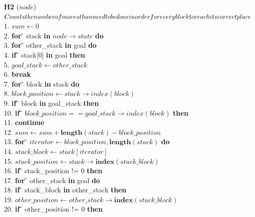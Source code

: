 \documentclass{article}
\begin{document}
\begin{center}
\begin{tabbing}
\textbf{H2} ($node$) \\
\rhd$ Counts the number of moves than need to be done in order \\ for every block to reach its correct place $\\
1. \indent $sum \leftarrow 0$ \\
2. \indent\textbf{for \=} stack \textbf{in} $node\rightarrow state$ \textbf{do}\\
3. \indent\>\textbf{for \=} {other\_stack} \textbf{in} goal \textbf{do}\\
4. \indent \>\>\textbf{if \=} stack[0] \textbf{in} goal \textbf{then}\\
5. \indent \>\>\>$goal\_stack\leftarrow other\_stack$\\
6. \indent \>\>\>\textbf{break}\\
7. \indent\>\textbf{for \=} block \textbf{in} stack \textbf{do}\\
8. \indent\>\>$block\_position\leftarrow stack\rightarrow index(block)$\\
9. \indent\>\>\textbf{if \=} block \textbf{in} {goal\_stack} \textbf{then}\\
10. \indent\>\>\>\textbf{if \=} $block\_position == goal\_stack\rightarrow index(block)$ \textbf{then}\\
11. \indent\>\>\>\>\textbf{continue}\\
12. \indent\>\> $sum\leftarrow sum + \textbf{length}(stack) - block\_position$\\
13. \indent\>\>\textbf{for \=} $iterator\leftarrow block\_position,\textbf{length}(stack)$ \textbf{do}\\
14. \indent\>\>\> $stack\_block\leftarrow stack[iterator]$\\
15. \indent\>\>\> $stack\_position\leftarrow stack\rightarrow \textbf{index}(stack\_block)$\\
16. \indent\>\>\>\textbf{if \=} {stack\_position} != 0 \textbf{then}\\
17. \indent\>\>\>\>\textbf{for \=} {other\_stack} \textbf{in} goal \textbf{do}\\
18. \indent\>\>\>\>\>\textbf{if \=} {stack\_block} \textbf{in} {other\_stack} \textbf{then}\\
19. \indent\>\>\>\>\>\>$other\_position\leftarrow other\_stack\rightarrow \textbf{index}(stack\_block)$\\
20. \indent\>\>\>\>\>\>\textbf{if \=} {other\_position} != 0 \textbf{then}\\

\end{tabbing}
\end{center}
\end{document}

